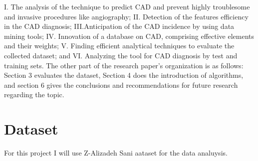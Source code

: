 \documentclass[sigconf]{acmart}
\begin{document}
I.	The analysis of the technique to predict CAD and prevent highly troublesome and invasive procedures like angiography;
II.	Detection of the features efficiency in the CAD diagnosis;
III.Anticipation of the CAD incidence by using data mining tools;
IV.	Innovation of a database on CAD, comprising effective elements and their weights;
V.	Finding efficient analytical techniques to evaluate the collected dataset; and
VI.	Analyzing the tool for CAD diagnosis by test and training sets.
The other part of the research paper’s organization is as follows: Section 3 evaluates the dataset, Section 4 does the introduction of algorithms, and section 6 gives the conclusions and recommendations for future research regarding the topic.



\section{Dataset}
For this project I will use Z-Alizadeh Sani aataset for the data analuysis.
    
\end{document}
